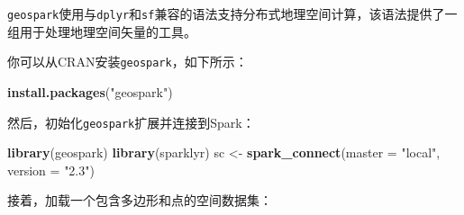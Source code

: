 \documentclass[
]{article}
\newenvironment{Shaded}{\begin{snugshade}}{\end{snugshade}}
\newcommand{\DataTypeTok}[1]{\textcolor[rgb]{0.13,0.29,0.53}{#1}}
\newcommand{\KeywordTok}[1]{\textcolor[rgb]{0.13,0.29,0.53}{\textbf{#1}}}
\newcommand{\NormalTok}[1]{#1}
\newcommand{\OperatorTok}[1]{\textcolor[rgb]{0.81,0.36,0.00}{\textbf{#1}}}
\newcommand{\StringTok}[1]{\textcolor[rgb]{0.31,0.60,0.02}{#1}}
\begin{document}
\texttt{geospark}使用与\texttt{dplyr}和\texttt{sf}兼容的语法支持分布式地理空间计算，该语法提供了一组用于处理地理空间矢量的工具。

你可以从CRAN安装\texttt{geospark}，如下所示：

\begin{Shaded}
\begin{Highlighting}[]
\KeywordTok{install.packages}\NormalTok{(}\StringTok{"geospark"}\NormalTok{)}
\end{Highlighting}
\end{Shaded}

然后，初始化\texttt{geospark}扩展并连接到Spark：

\begin{Shaded}
\begin{Highlighting}[]
\KeywordTok{library}\NormalTok{(geospark)}
\KeywordTok{library}\NormalTok{(sparklyr)}
\NormalTok{sc <-}\StringTok{ }\KeywordTok{spark_connect}\NormalTok{(}\DataTypeTok{master =} \StringTok{"local"}\NormalTok{, }\DataTypeTok{version =} \StringTok{"2.3"}\NormalTok{)}
\end{Highlighting}
\end{Shaded}

接着，加载一个包含多边形和点的空间数据集：

\begin{Shaded}
\end{Shaded}
\end{document}
